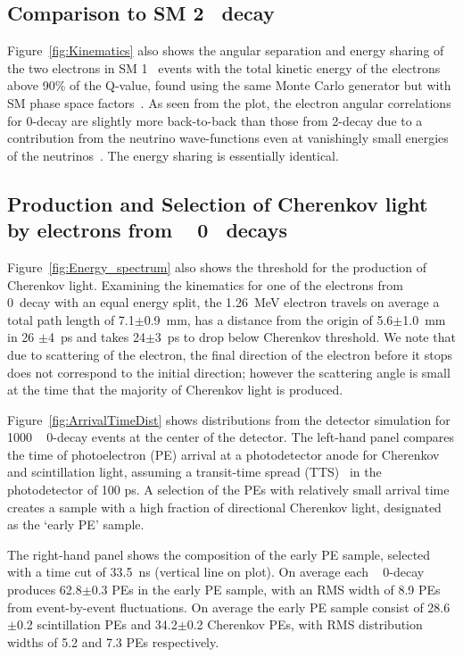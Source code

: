 \subsection{Comparison to SM 2\nbb~ decay}
\label{comparison}

Figure~\ref{fig:Kinematics} also shows the angular separation and
energy sharing of the two electrons in SM 1\nbb~ events with the total kinetic
energy of the electrons above 90\% of the Q-value, found using the
same Monte Carlo generator but with SM phase space
factors~\cite{Jenni}.  As seen from the plot, the electron angular
correlations for 0\nbb-decay are slightly more back-to-back than those
from 2\nbb-decay due to a contribution from the neutrino
wave-functions even at vanishingly small energies of the
neutrinos~\cite{Jenni}. The energy sharing is essentially
identical.

\subsection{Production and Selection 
of Cherenkov light by electrons from \Te~ 0\nbb~ decays}
Figure~\ref{fig:Energy_spectrum} also shows the threshold for the
production of Cherenkov light.
Examining the kinematics for one of the electrons from \Te~
0\nbb~decay with an equal energy split, the 1.26~MeV electron travels
on average a total path length of 7.1$\pm$0.9~mm, has a distance from
the origin of 5.6$\pm$1.0~mm in 26 $\pm$4~ps and takes
24$\pm$3~ps to drop below Cherenkov threshold.  We note that due
to scattering of the electron, the final direction of the electron
before it stops does not correspond to the initial direction; however
the scattering angle is small at the time that the majority of
Cherenkov light is produced.

Figure~\ref{fig:ArrivalTimeDist} shows distributions from the detector
simulation for 1000 \Te~ 0\nbb-decay events at the center of the
detector. The left-hand panel compares the time of photoelectron (PE)
arrival at a photodetector anode for Cherenkov and scintillation
light, assuming a transit-time spread (TTS)~\cite{TTS} in the
photodetector of 100 ps.  A selection of the PEs with relatively small
arrival time creates a sample with a high fraction of directional
Cherenkov light, designated as the `early PE' sample.

The right-hand panel shows the composition of the early PE sample,
selected with a time cut of 33.5~ns (vertical line on plot). On
average each \Te~ 0\nbb-decay produces 62.8$\pm$0.3 PEs in the early
PE sample, with an RMS width of 8.9 PEs from event-by-event
fluctuations.  On average the early PE sample consist of 28.6$\pm$0.2
scintillation PEs and 34.2$\pm$0.2 Cherenkov PEs, with RMS
distribution widths of 5.2 and 7.3 PEs respectively.



